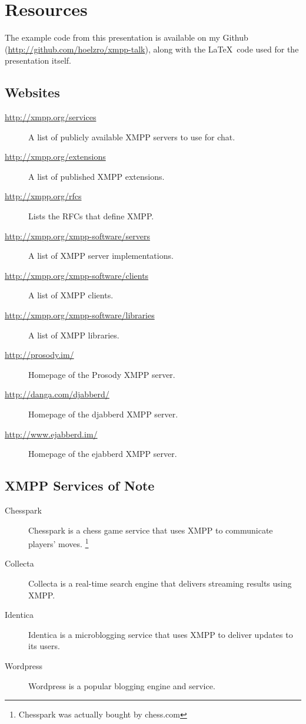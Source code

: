\appendix
\section{Resources}

The example code from this presentation is available on my Github (\url{http://github.com/hoelzro/xmpp-talk}), along
with the \LaTeX\ code used for the presentation itself.

\subsection*{Websites}

\begin{description}
\item[\url{http://xmpp.org/services}] A list of publicly available XMPP servers to use for chat.
\item[\url{http://xmpp.org/extensions}] A list of published XMPP extensions.
\item[\url{http://xmpp.org/rfcs}] Lists the RFCs that define XMPP.
\item[\url{http://xmpp.org/xmpp-software/servers}] A list of XMPP server implementations.
\item[\url{http://xmpp.org/xmpp-software/clients}] A list of XMPP clients.
\item[\url{http://xmpp.org/xmpp-software/libraries}] A list of XMPP libraries.
\item[\url{http://prosody.im/}] Homepage of the Prosody XMPP server.
\item[\url{http://danga.com/djabberd/}] Homepage of the djabberd XMPP server.
\item[\url{http://www.ejabberd.im/}] Homepage of the ejabberd XMPP server.
\end{description}

\subsection*{XMPP Services of Note}

\begin{description}
\item[Chesspark] Chesspark is a chess game service that uses XMPP to communicate players' moves. \footnote{Chesspark was actually bought by chess.com}
\item[Collecta]  Collecta is a real-time search engine that delivers streaming results using XMPP.
\item[Identica]  Identica is a microblogging service that uses XMPP to deliver updates to its users.
\item[Wordpress]  Wordpress is a popular blogging engine and service.
\end{description}

